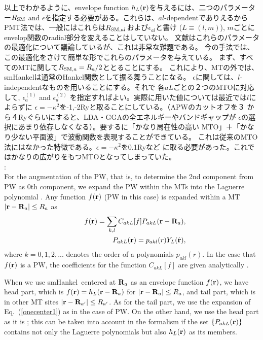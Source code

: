 \documentclass[twocolumn,showpacs,preprintnumbers,amsmath,amssymb,floatfix]{revtex4-1}
\newcommand{\bfr}{{\bf r}}
\newcommand{\hbfr}{\hat{\bf r}}
\newcommand{\bfR}{{\bf R}}
\def\epsilonaone{\epsilon^{(1)}_a}
\def\epsilonatwo{\epsilon^{(2)}_a}
\newcommand{\req}[1]{\mbox{Eq.~\!(\ref{#1})}}
\def\smh{smHankel}
\def\RSM{R_{\rm SM}}
\def\RSMa{R_{{\rm SM},a}}
\def\RSMal{R_{{\rm SM},al}}
\def\pakl{p_{akl}}
\def\PakL{P_{akL}}
\def\CakL{C_{akL}}
\def\smh{smHankel}
\def\RSM{R_{\rm SM}}
\def\RSMa{R_{{\rm SM},a}}
\def\RSMal{R_{{\rm SM},al}}
\def\pakl{p_{akl}}
\def\PakL{P_{akL}}
\def\CakL{C_{akL}}
\begin{document}
以上でわかるように、envelope
function $h_L(\bfr)$を与えるには、二つのパラメーター$\RSM$ and
$\epsilon$を指定する必要がある。これらは、$al$-dependentでありえるから
PMT法では、一般にはこれらは$\RSMal$および$\epsilon_{al}$と書け
($L\equiv(l,m)$), $m$ごとにenvelop関数のradial部分を変えることはしていない。
文献\cite{lmfchap}はこれらのパラメータの最適化について議論しているが、これは非常な難題である。
今の手法では、この最適化をさけて簡単な形でこれらのパラメータを与えている。
まず、すべてのMTに関して$\RSMa= R_a/2$ととることにする。
これにより、MTの外では、\smh は通常のHankel関数として振る舞うことになる。
$\epsilon$に関しては、$l$-independentなものを用いることにする。それで
各$aL$ごとの２つのMTOに対応して, $\epsilonaone$ and $\epsilonatwo$ 
を指定すればよい。実際に用いた値については最近では$l$によらずに
$\epsilon=-\kappa^2$を-1,-2Ryと取ることにしている。（APWのカットオフを３
から４Ryぐらいにすると、LDA・GGAの全エネルギーやバンドギャップが
$\epsilon$の選択にあまり依存しなくなる）。要するに「かなり局在性の高い
MTO」＋「かなり少ない平面波」で波動関数を表現することができている。
これは従来のMTO法にはなかった特徴である。$\epsilon=-\kappa^2$を0.1Ryなど
に取る必要があった。これではかなりの広がりをもつMTOとなってしまっていた。\\

:\\
For the augmentation of the PW, that is, to determine the 2nd component
from PW as 0th component, we expand the PW within the MTs into the
Laguerre polynomial \cite{pmt1}.  Any function $f(\bfr)$ (PW in this
case) is expanded within a MT $|\bfr-\bfR_a|\leq R_a$ as
\begin{eqnarray}
&&f(\bfr)= \sum_{k,l} \CakL[f] \PakL(\bfr-\bfR_a), \label{onecenter1}\\
&&\PakL(\bfr)=\pakl(r) Y_L(\hbfr) \label{onecenter2},
\end{eqnarray}
where $k=0,1,2,...$ denotes the order of a polynomials $\pakl(r)$.  In
the case that $f(\bfr)$ is a PW, the coefficients for the function
$\CakL[f]$ are given analytically \cite{Bott98}.

When we use \smh\ centered at $\bfR_a$ as an envelope function
$f(\bfr)$, 
we have head part, which is $f(\bfr)=h_L(\bfr-\bfR_a)$ for
$|\bfr-\bfR_a| \leq R_a$, and tail part, which is in other MT
sites $|\bfr-\bfR_{a'}| \leq R_{a'}$.  As for the tail part, we use the
expansion of \req{onecenter1} as in the case of PW. On the other hand, we
use the head part as it is \cite{privatemark1};
this can be taken into account in the formalism 
if the set $\{\PakL(\bfr) \}$ contains not only the Laguerre
polynomials but also $h_L(\bfr)$ as its members.\\
\end{document}
